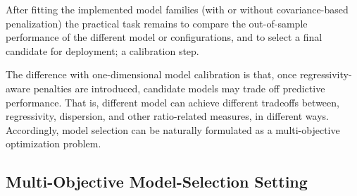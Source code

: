 \documentclass[12pt, draft]{article}
\theoremstyle{plain}
\theoremstyle{definition}
\newcommand{\1}{\mathbf{1}}
\begin{document}
 After fitting the implemented model families (with or without covariance-based penalization) the practical task remains to compare the out-of-sample performance of the different model or configurations, and to select a final candidate for deployment; a calibration step.
 
The difference with one-dimensional model calibration is that, once regressivity-aware penalties are introduced, candidate models may trade off predictive performance. That is, different model can achieve different tradeoffs between, regressivity, dispersion, and other ratio-related measures, in different ways. Accordingly, model selection can be naturally formulated as a multi-objective optimization problem. 




\subsection{Multi-Objective Model-Selection Setting}




\end{document}
